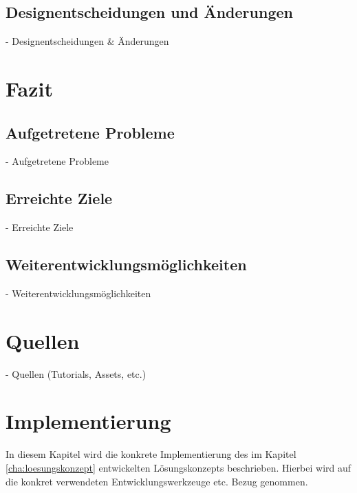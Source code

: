 \documentclass[oneside]{ausarbeitung}
\begin{document}
\section{Designentscheidungen und Änderungen}

  - Designentscheidungen & Änderungen


\chapter{Fazit}

\section{Aufgetretene Probleme}

  - Aufgetretene Probleme


\section{Erreichte Ziele}

  - Erreichte Ziele


\section{Weiterentwicklungsmöglichkeiten}

  - Weiterentwicklungsmöglichkeiten


\chapter{Quellen}

- Quellen (Tutorials, Assets, etc.)












\chapter{Implementierung}
\label{cha:implementierung}

In diesem Kapitel wird die konkrete Implementierung des im Kapitel
\ref{cha:loesungskonzept} entwickelten Lösungskonzepts beschrieben.
Hierbei wird auf die konkret verwendeten Entwicklungswerkzeuge etc. 
Bezug genommen.
\end{document}

